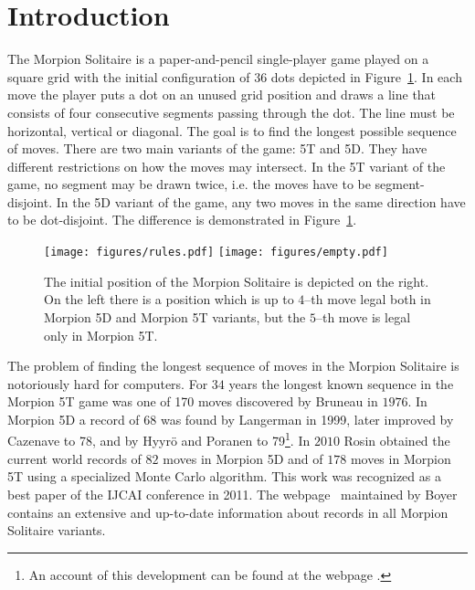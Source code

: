 
\section{Introduction}
The Morpion Solitaire is a paper-and-pencil single-player game played on a square grid with 
  the initial configuration of 36 dots depicted in Figure~\ref{fig:initial}. 
In each move the player puts a dot on an unused grid position and draws a line that 
  consists of four consecutive segments passing through the dot. 
The line must be horizontal, vertical or diagonal. 
The goal is to find the longest possible sequence of moves.
There are two main variants of the game: 5T and 5D. 
They have different restrictions on how the moves may intersect.
In the 5T variant of the game, no segment may be drawn twice, i.e. the moves have to be segment-disjoint. 
In the 5D variant of the game, any two moves in the same direction have to be dot-disjoint.
The difference is demonstrated in Figure~\ref{fig:initial}. %

  \begin{figure}
    \centering
      \texttt{[image: figures/rules.pdf]}
      \texttt{[image: figures/empty.pdf]}
      \caption{\label{fig:initial}
	The initial position of the Morpion Solitaire is depicted on the right. On the left there is a position which is up to $4$--th move legal 
both in Morpion 5D and Morpion 5T variants, but the $5$--th move is legal only in Morpion 5T. 
      }
\end{figure}

The problem of finding the longest sequence of moves in the Morpion Solitaire is notoriously hard for computers. 
For $34$ years the longest known sequence in the Morpion 5T game
  was one of 170 moves discovered by Bruneau in $1976$. In Morpion 5D a record of 68 was found by Langerman in 1999, later improved by Cazenave \cite{tristan78} to 78, and by Hyyrö and Poranen \cite{finowie} to 79\footnote{An account of this development can be found at the webpage \cite{langerman}.}.
In $2010$ Rosin \cite{rosin} obtained the current world records of $82$ moves in Morpion 5D and of $178$ moves in Morpion 5T 
  using a specialized Monte Carlo algorithm. This work  was
   recognized as a best paper of the IJCAI conference in 2011. The webpage~\cite{boyer} maintained by Boyer contains an extensive and up-to-date information about records in all Morpion Solitaire variants.

